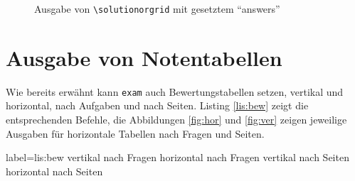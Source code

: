 \begin{figure}
\caption{Ausgabe von \texttt{\textbackslash solutionorgrid} mit gesetztem \enquote{answers}}\label{fig:solbox2}
\end{figure}

\section{Ausgabe von Notentabellen}

Wie bereits erwähnt kann \texttt{exam} auch Bewertungstabellen setzen, vertikal und horizontal, nach Aufgaben und nach Seiten. Listing \ref{lis:bew} zeigt die entsprechenden Befehle, die Abbildungen \ref{fig:hor} und \ref{fig:ver} zeigen jeweilige Ausgaben für horizontale Tabellen nach Fragen und Seiten.

\begin{lfgwcode}{label={lis:bew}}
\gradetable[v][questions] vertikal nach Fragen
\gradetable[h][questions] horizontal nach Fragen
\gradetable[v][pages] vertikal nach Seiten
\gradetable[h][pages] horizontal nach Seiten
\end{lfgwcode}

